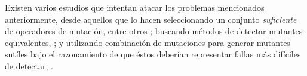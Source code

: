Existen varios estudios que intentan atacar los problemas mencionados anteriormente, desde aquellos que lo hacen seleccionando un conjunto \emph{suficiente} de operadores de mutaci\'on, entre otros \cite{bibliography.mutation.selection.Offutt96, bibliography.mutation.selection.ASN2008}; buscando m\'etodos de detectar mutantes equivalentes, \cite{biblography.mutation.evaluation.equivalent.Grun+09, biblography.mutation.evaluation.equivalent.Schuler+10, biblography.mutation.evaluation.equivalent.Schuler+13, biblography.mutation.evaluation.equivalent.Just+13}; y utilizando combinaci\'on de mutaciones para generar mutantes sut\'iles bajo el razonamiento de que \'estos deber\'ian representar fallas m\'as dif\'iciles de detectar, \cite{bibliography.mutation.highorder.Jia+08, bibliography.mutation.highorder.Jia+09, bibliography.mutation.highorder.Harman+11}.










